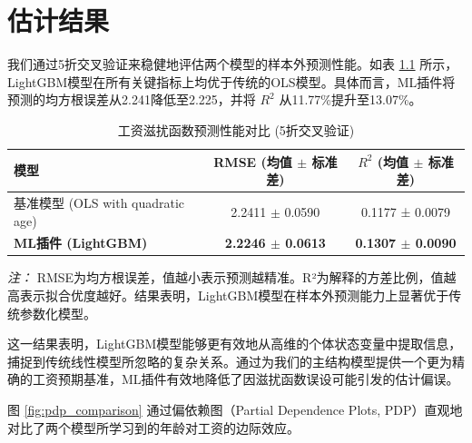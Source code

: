 \documentclass[master, final]{zufe-thesis}
\begin{document}
\chapter{估计结果}


我们通过5折交叉验证来稳健地评估两个模型的样本外预测性能。如表 \ref{tab:ml_performance_comparison} 所示，LightGBM模型在所有关键指标上均优于传统的OLS模型。具体而言，ML插件将预测的均方根误差从2.241降低至2.225，并将 $R^2$ 从11.77\%提升至13.07\%。




\begin{table}[!ht]
\centering
\caption{工资滋扰函数预测性能对比 (5折交叉验证)}
\label{tab:ml_performance_comparison}
\begin{tabular}{lcc}
\toprule
\textbf{模型} & \textbf{RMSE (均值 $\pm$ 标准差)} & \textbf{$R^2$ (均值 $\pm$ 标准差)} \\
\midrule
基准模型 (OLS with quadratic age) & 2.2411 $\pm$ 0.0590 & 0.1177 ± 0.0079 \\
\textbf{ML插件 (LightGBM)} & \textbf{2.2246 $\pm$ 0.0613} & \textbf{0.1307 $\pm$ 0.0090} \\
\bottomrule
\end{tabular}
\vspace{1em}
\begin{minipage}{\linewidth}
\small
\textit{注：} RMSE为均方根误差，值越小表示预测越精准。R²为解释的方差比例，值越高表示拟合优度越好。结果表明，LightGBM模型在样本外预测能力上显著优于传统参数化模型。
\end{minipage}
\end{table}
这一结果表明，LightGBM模型能够更有效地从高维的个体状态变量中提取信息，捕捉到传统线性模型所忽略的复杂关系。通过为我们的主结构模型提供一个更为精确的工资预期基准，ML插件有效地降低了因滋扰函数误设可能引发的估计偏误。





图 \ref{fig:pdp_comparison} 通过偏依赖图（Partial Dependence Plots, PDP）直观地对比了两个模型所学习到的年龄对工资的边际效应。
\end{document}
